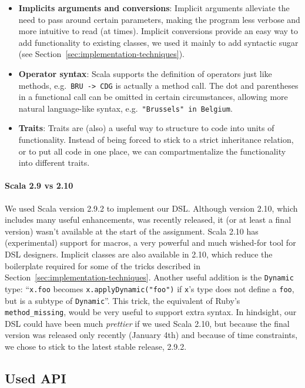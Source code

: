 \documentclass[a4paper]{article}
\newcommand{\cc}[1]{\texttt{#1}}
\renewcommand{\sc}[1]{\lstinline{#1}}
\begin{document}
\begin{itemize}
\item \textbf{Implicits arguments and conversions}:
  Implicit arguments alleviate the need to pass around certain parameters, making the program less verbose and more intuitive to read (at times).
  Implicit conversions provide an easy way to add functionality to existing classes, we used it mainly to add syntactic sugar (see Section~\ref{sec:implementation-techniques}).
\item \textbf{Operator syntax}:
  Scala supports the definition of operators just like methods, e.g.\ \sc{BRU -> CDG} is actually a method call.
  The dot and parentheses in a functional call can be omitted in certain circumstances, allowing more natural language-like syntax, e.g.\ \sc{"Brussels" in Belgium}.
\item \textbf{Traits}:
  Traits are (also) a useful way to structure to code into units of functionality.
  Instead of being forced to stick to a strict inheritance relation, or to put all code in one place, we can compartmentalize the functionality into different traits.
\end{itemize}

\paragraph{Scala 2.9 vs 2.10}

We used Scala version 2.9.2 to implement our DSL.
Although version 2.10, which includes many useful enhancements, was recently released, it (or at least a final version) wasn't available at the start of the assignment.
Scala 2.10 has (experimental) support for macros, a very powerful and much wished-for tool for DSL designers.
Implicit classes are also available in 2.10, which reduce the boilerplate required for some of the tricks described in Section~\ref{sec:implementation-techniques}.
Another useful addition is the \cc{Dynamic} type: ``\sc{x.foo} becomes \sc{x.applyDynamic("foo")} if \sc{x}'s type does not define a \sc{foo}, but is a subtype of \cc{Dynamic}''.
This trick, the equivalent of Ruby's \cc{method\_missing}, would be very useful to support extra syntax.
In hindsight, our DSL could have been much \emph{prettier} if we used Scala 2.10, but because the final version was released only recently (January 4th) and because of time constraints, we chose to stick to the latest stable release, 2.9.2.


\subsection{Used API}
\label{sec:used-api}
\end{document}
